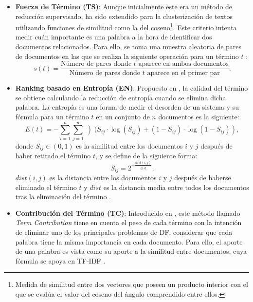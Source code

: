 \documentclass[10pt, a4paper]{article}
\begin{document}
\begin{itemize}
  \item \textbf{Fuerza de Término (TS)}: Aunque inicialmente este era un método de reducción supervisado, ha sido extendido para la clusterización de textos utilizando funciones de similitud como la del coseno\footnote{Medida de similitud entre dos vectores que poseen un producto interior con el que se evalúa el valor del coseno del ángulo comprendido entre ellos.}. Este criterio intenta medir cuán importante es una palabra a la hora de identificar dos documentos relacionados. Para ello, se toma una muestra aleatoria de pares de documentos en las que se realiza la siguiente operación para un término $t$ \cite{survey, An Evaluation on Feature Selection for Text Clustering}: \begin{equation} s(t) = \frac{\text{Número de pares donde } t \text{ aparece en ambos documentos}}{\text{Número de pares donde } t \text{ aparece en el primer par}}.\end{equation} 
  
  \item \textbf{Ranking basado en Entropía (EN)}: Propuesto en \cite{entropia}, la calidad del término se obtiene calculando la reducción de entropía cuando se elimina dicha palabra. La entropía es una forma de medir el desorden de un sistema y su fórmula para un término $t$ en un conjunto de $n$ documentos es la siguiente: \begin{equation} E(t) = - \sum_{i=1}^{n} \sum_{j=1}^{n} \left)( S_{ij} \cdotp \log \left(S_{ij} \right) + \left( 1 - S_{ij}\right) \cdotp \log \left( 1 - S_{ij}\right) \right), \end{equation} donde $S_{ij} \in (0,1)$ es la similitud entre los documentos $i$ y $j$ después de haber retirado el término $t$, y se define de la siguiente forma:  \begin{equation} S_{ij} = 2^{- \frac{dist\left(i,j\right)}{\overline{dist}}}. \end{equation} $dist(i,j)$ es la distancia entre los documentos $i$ y $j$ después de haberse eliminado el término $t$ y $\overline{dist}$ es la distancia media entre todos los documentos tras la eliminación del término \cite{survey, An Evaluation on Feature Selection for Text Clustering}.
  
  \item \textbf{Contribución del Término (TC)}: Introducido en \cite{An Evaluation on Feature Selection for Text Clustering}, este método llamado \textit{Term Contribution} tiene en cuenta el peso de cada término con la intención de eliminar uno de los principales problemas de DF: considerar que cada palabra tiene la misma importancia en cada documento. Para ello, el aporte de una palabra es vista como su aporte a la similitud entre documentos, cuya fórmula se apoya en TF-IDF \cite{survey, An Evaluation on Feature Selection for Text Clustering}.
\end{itemize}
\end{document}
